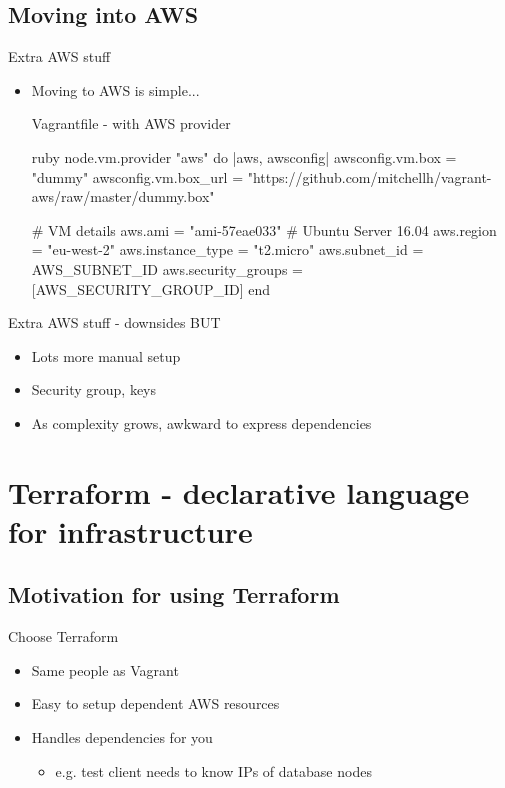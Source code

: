\documentclass[xcolor=dvipsnames]{beamer}
\begin{document}
\subsection[Cloudy time]{Moving into AWS}
\begin{frame}[fragile]{Extra AWS stuff}
  \begin{itemize}
    \item Moving to AWS is simple...
    \begin{block}{Vagrantfile - with AWS provider}
      \begin{code}{ruby}
node.vm.provider "aws" do |aws, awsconfig|
  awsconfig.vm.box     = "dummy"
  awsconfig.vm.box_url = "https://github.com/mitchellh/vagrant-aws/raw/master/dummy.box"

  # VM details
  aws.ami                = "ami-57eae033" # Ubuntu Server 16.04
  aws.region             = "eu-west-2"
  aws.instance_type      = "t2.micro"
  aws.subnet_id          = AWS_SUBNET_ID
  aws.security_groups    = [AWS_SECURITY_GROUP_ID]
end
      \end{code}
    \end{block}
  \end{itemize}
\end{frame}

\begin{frame}{Extra AWS stuff - downsides}
BUT
  \begin{itemize}
    \item Lots more manual setup
    \item Security group, keys
    \item As complexity grows, awkward to express dependencies
  \end{itemize}
\end{frame}

\section[Terraform]{Terraform - declarative language for infrastructure}

\subsection[Motivation]{Motivation for using Terraform}
\begin{frame}{Choose Terraform}
  \begin{itemize}
    \item Same people as Vagrant
    \item Easy to setup dependent AWS resources
    \item Handles dependencies for you
    \begin{itemize}
      \item e.g. test client needs to know IPs of database nodes
    \end{itemize}
  \end{itemize}
\end{frame}
\end{document}
